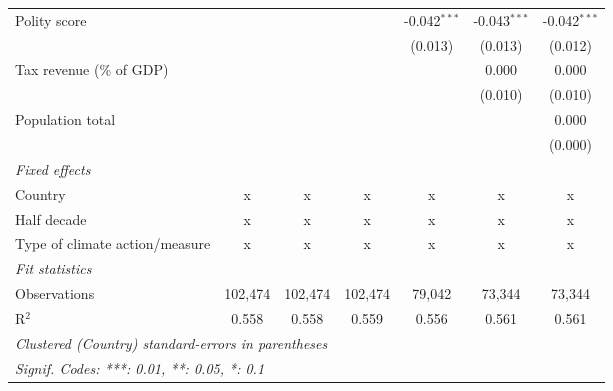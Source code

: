 \begin{tabular}{lcccccc}
   Polity score                                              &         &                &                & -0.042$^{***}$ & -0.043$^{***}$ & -0.042$^{***}$\\   
                                                             &         &                &                & (0.013)        & (0.013)        & (0.012)\\   
   Tax revenue (\% of GDP)                                   &         &                &                &                & 0.000          & 0.000\\   
                                                             &         &                &                &                & (0.010)        & (0.010)\\   
   Population total                                          &         &                &                &                &                & 0.000\\   
                                                             &         &                &                &                &                & (0.000)\\   
   \emph{Fixed effects}\\
   Country                                                   & x       & x              & x              & x              & x              & x\\  
   Half decade                                               & x       & x              & x              & x              & x              & x\\  
   Type of climate action/measure                            & x       & x              & x              & x              & x              & x\\  
   \midrule \emph{Fit statistics}\\
   Observations                                              & 102,474 & 102,474        & 102,474        & 79,042         & 73,344         & 73,344\\  
   R$^2$                                                     & 0.558   & 0.558          & 0.559          & 0.556          & 0.561          & 0.561\\  
   \midrule
   \multicolumn{7}{l}{\emph{Clustered (Country) standard-errors in parentheses}}\\
   \multicolumn{7}{l}{\emph{Signif. Codes: ***: 0.01, **: 0.05, *: 0.1}}\\
\end{tabular}
\par\endgroup


